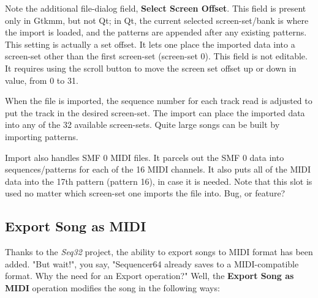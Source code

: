    Note the additional file-dialog field,
   \textbf{Select Screen Offset}.
   This field is present only in Gtkmm, but not Qt; in Qt, the current
   selected screen-set/bank is where the import is loaded, and the patterns
   are appended after any existing patterns.
   This setting is actually a set offset.
   It lets one place the imported data into a screen-set other than
   the first screen-set (screen-set 0).
   This field is not editable.  It requires using the scroll button to move the
   screen set offset up or down in value, from 0 to 31.

   When the file is imported, the sequence number for each track read is
   adjusted to put the track in the desired screen-set.
   The import can place the imported data into any of the 32 available
   screen-sets.  Quite large songs can be built by importing patterns.

   Import also handles SMF 0 MIDI files.  It parcels out the SMF 0 data
   into sequences/patterns for each of the 16 MIDI channels.  It also puts
   all of the MIDI data into the 17th pattern (pattern 16), in case it is
   needed.  Note that this slot is used no matter which screen-set one imports
   the file into.  Bug, or feature?

\subsection{Export Song as MIDI}
\label{subsec:seq64_midi_export_file_export}

   Thanks to the \textsl{Seq32} project, the ability to export songs to MIDI
   format has been added.
   "But wait!", you say, "Sequencer64 already saves to a MIDI-compatible
   format.  Why the need for an Export operation?"
   Well, the \textbf{Export Song as MIDI} operation modifies the song in the
   following ways:

